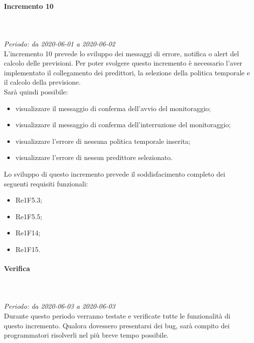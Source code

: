 \paragraph{Incremento 10}\mbox{} \\ \mbox{} \\ 
\textit{Periodo: da 2020-06-01 a 2020-06-02}\\
L’incremento 10 prevede lo sviluppo dei messaggi di errore, notifica o alert del calcolo delle previsioni. Per poter svolgere questo incremento è necessario l'aver implementato il collegamento dei predittori, la selezione della politica temporale e il calcolo della previsione. \\
Sarà quindi possibile:
\begin{itemize}
	\item visualizzare il messaggio di conferma dell'avvio del monitoraggio;
	\item visualizzare il messaggio di conferma dell'interruzione del monitoraggio;
	\item visualizzare l'errore di nessuna politica temporale inserita;
	\item visualizzare l'errore di nessun predittore selezionato.
\end{itemize}
Lo sviluppo di questo incremento prevede il soddisfacimento completo dei seguenti requisiti funzionali:
\begin{itemize}
\item Re1F5.3;
\item Re1F5.5;
\item Re1F14;
\item Re1F15.
\end{itemize}
\paragraph*{Verifica}\mbox{} \\ \mbox{} \\ 
\textit{Periodo: da 2020-06-03 a 2020-06-03}\\
Durante questo periodo verranno testate e verificate tutte le funzionalità di questo incremento. Qualora dovessero presentarsi dei bug, sarà compito dei programmatori risolverli nel più breve tempo possibile.

